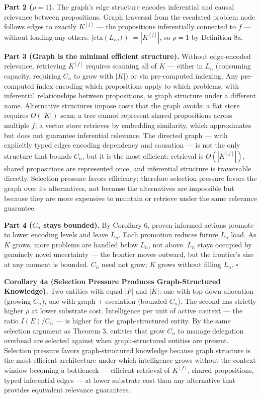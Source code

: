 \documentclass[
]{article}
\begin{document}
\textbf{Part 2 (\(\rho = 1\)).} The graph's edge structure encodes
inferential and causal relevance between propositions. Graph traversal
from the escalated problem node follows edges to exactly \(K^{[f]}\) ---
the propositions inferentially connected to \(f\) --- without loading
any others. \(|\text{ctx}(L_n, t)| = |K^{[f]}|\), so \(\rho = 1\) by
Definition 8a.

\textbf{Part 3 (Graph is the minimal efficient structure).} Without
edge-encoded relevance, retrieving \(K^{[f]}\) requires scanning all of
\(K\) --- either in \(L_n\) (consuming capacity, requiring \(C_n\) to
grow with \(|K|\)) or via pre-computed indexing. Any pre-computed index
encoding which propositions apply to which problems, with inferential
relationships between propositions, is graph structure under a different
name. Alternative structures impose costs that the graph avoids: a flat
store requires \(O(|K|)\) scan; a tree cannot represent shared
propositions across multiple \(f\); a vector store retrieves by
embedding similarity, which approximates but does not guarantee
inferential relevance. The directed graph --- with explicitly typed
edges encoding dependency and causation --- is not the only structure
that bounds \(C_n\), but it is the most efficient: retrieval is
\(O(|K^{[f]}|)\), shared propositions are represented once, and
inferential structure is traversable directly. Selection pressure favors
efficiency; therefore selection pressure favors the graph over its
alternatives, not because the alternatives are impossible but because
they are more expensive to maintain or retrieve under the same relevance
guarantee.

\textbf{Part 4 (\(C_n\) stays bounded).} By Corollary 6, proven informed
actions promote to lower encoding levels and leave \(L_n\). Each
promotion reduces future \(L_n\) load. As \(K\) grows, more problems are
handled below \(L_n\), not above. \(L_n\) stays occupied by genuinely
novel uncertainty --- the frontier moves outward, but the frontier's
size at any moment is bounded. \(C_n\) need not grow; \(K\) grows
without filling \(L_n\). \(\square\)

\textbf{Corollary 4a (Selection Pressure Produces Graph-Structured
Knowledge).} Two entities with equal \(|F|\) and \(|K|\): one with
top-down allocation (growing \(C_n\)), one with graph + escalation
(bounded \(C_n\)). The second has strictly higher \(\rho\) at lower
substrate cost. Intelligence per unit of active context --- the ratio
\(I(E)/C_n\) --- is higher for the graph-structured entity. By the same
selection argument as Theorem 3, entities that grow \(C_n\) to manage
delegation overhead are selected against when graph-structured entities
are present. Selection pressure favors graph-structured knowledge
because graph structure is the most efficient architecture under which
intelligence grows without the context window becoming a bottleneck ---
efficient retrieval of \(K^{[f]}\), shared propositions, typed
inferential edges --- at lower substrate cost than any alternative that
provides equivalent relevance guarantees.
\end{document}

